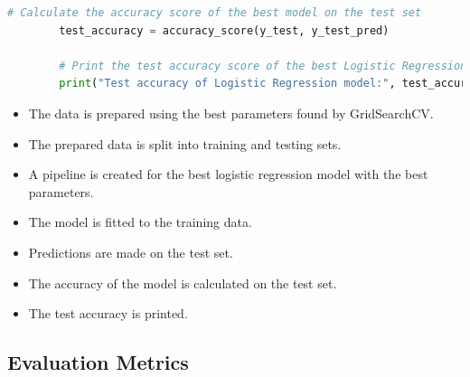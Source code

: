 \documentclass{solutionclass} %
\begin{document}
\begin{solution}
\begin{lstlisting}[language=Python]
        # Calculate the accuracy score of the best model on the test set
        test_accuracy = accuracy_score(y_test, y_test_pred)
        
        # Print the test accuracy score of the best Logistic Regression model
        print("Test accuracy of Logistic Regression model:", test_accuracy)
        \end{lstlisting}
        
        \begin{itemize}
            \item The data is prepared using the best parameters found by GridSearchCV.
            \item The prepared data is split into training and testing sets.
            \item A pipeline is created for the best logistic regression model with the best parameters.
            \item The model is fitted to the training data.
            \item Predictions are made on the test set.
            \item The accuracy of the model is calculated on the test set.
            \item The test accuracy is printed.
        \end{itemize}
        
\end{solution}




\subsection*{Evaluation Metrics}
\end{document}
